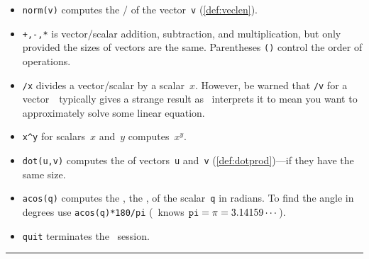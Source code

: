 \begin{table}
\begin{minipage}{\linewidth}
\begin{itemize}
\item {}\verb|norm(v)| computes the \slash {} of the vector~\verb|v| (\autoref{def:veclen}).

\item {}\verb|+,-,*| is vector\slash scalar addition, subtraction, and multiplication, but only provided the sizes of vectors are the same.
Parentheses \verb|()| control the order of operations.

\item {}\verb|/x| divides a vector\slash scalar by a scalar~\(x\).
However, be warned that \verb|/v| for a vector~\vv\ typically gives a strange result as \script\ interprets it to mean you want to approximately solve some linear equation.

\item {}\verb|x^y| for scalars~\(x\) and~\(y\) computes~\(x^y\).

\item {}\verb|dot(u,v)| computes the  of vectors~\verb|u| and~\verb|v| (\autoref{def:dotprod})---if they have the same size.

\item {}\verb|acos(q)| computes the , the , of the scalar~\verb|q| in radians.  
To find the angle in degrees use \verb|acos(q)*180/pi| (\script\ knows \(\verb|pi|=\pi=3.14159\cdots\)).

\item {}\verb|quit| terminates the \script\ session.
\end{itemize}
\end{minipage}
\hrule
\end{table}




